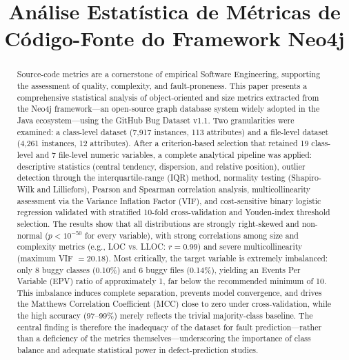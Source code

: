 \documentclass[conference]{IEEEtran}
\begin{document}
\title{Análise Estatística de Métricas de Código-Fonte do Framework Neo4j}

\author{
}

\maketitle

\begin{abstract}
Source-code metrics are a cornerstone of empirical Software Engineering,
supporting the assessment of quality, complexity, and fault-proneness. This
paper presents a comprehensive statistical analysis of object-oriented and size
metrics extracted from the Neo4j framework---an open-source graph database
system widely adopted in the Java ecosystem---using the GitHub Bug Dataset
v1.1. Two granularities were examined: a class-level dataset (7,917 instances,
113 attributes) and a file-level dataset (4,261 instances, 12 attributes). After
a criterion-based selection that retained 19 class-level and 7 file-level numeric
variables, a complete analytical pipeline was applied: descriptive statistics
(central tendency, dispersion, and relative position), outlier detection through
the interquartile-range (IQR) method, normality testing (Shapiro-Wilk and
Lilliefors), Pearson and Spearman correlation analysis, multicollinearity
assessment via the Variance Inflation Factor (VIF), and cost-sensitive binary
logistic regression validated with stratified 10-fold cross-validation and
Youden-index threshold selection. The results show that all distributions are
strongly right-skewed and non-normal ($p < 10^{-50}$ for every variable), with
strong correlations among size and complexity metrics (e.g., LOC vs. LLOC:
$r = 0.99$) and severe multicollinearity (maximum VIF $= 20.18$). Most
critically, the target variable is extremely imbalanced: only 8 buggy classes
(0.10\%) and 6 buggy files (0.14\%), yielding an Events Per Variable (EPV) ratio
of approximately 1, far below the recommended minimum of 10. This imbalance
induces complete separation, prevents model convergence, and drives the Matthews
Correlation Coefficient (MCC) close to zero under cross-validation, while the
high accuracy (97--99\%) merely reflects the trivial majority-class baseline. The
central finding is therefore the inadequacy of the dataset for fault
prediction---rather than a deficiency of the metrics themselves---underscoring
the importance of class balance and adequate statistical power in
defect-prediction studies.
\end{abstract}
\end{document}
